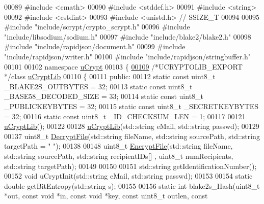 \begin{DoxyCode}
00089 \textcolor{preprocessor}{#include <cmath>}
00090 \textcolor{preprocessor}{#include <stddef.h>}
00091 \textcolor{preprocessor}{#include <string>}
00092 \textcolor{preprocessor}{#include <cstdint>}
00093 \textcolor{preprocessor}{#include <unistd.h>} \textcolor{comment}{// SSIZE\_T}
00094 
00095 \textcolor{preprocessor}{#include "include/scrypt/crypto\_scrypt.h"}
00096 \textcolor{preprocessor}{#include "include/libsodium/sodium.h"}
00097 \textcolor{preprocessor}{#include "include/blake2/blake2.h"}
00098 \textcolor{preprocessor}{#include "include/rapidjson/document.h"}
00099 \textcolor{preprocessor}{#include "include/rapidjson/writer.h"}
00100 \textcolor{preprocessor}{#include "include/rapidjson/stringbuffer.h"}
00101 
00102 \textcolor{keyword}{namespace }\hyperlink{namespaceuCrypt}{uCrypt}
00103 \{
\hypertarget{uCryptLib_8h_source_l00109}{}\hyperlink{classuCrypt_1_1uCryptLib}{00109}   \textcolor{comment}{/*UCRYPTOLIB\_EXPORT */}\textcolor{keyword}{class }\hyperlink{classuCrypt_1_1uCryptLib}{uCryptLib}
00110   \{
00111   \textcolor{keyword}{public}:
00112     \textcolor{keyword}{static} \textcolor{keyword}{const} uint8\_t \_BLAKE2S\_OUTBYTES = 32;
00113     \textcolor{keyword}{static} \textcolor{keyword}{const} uint8\_t \_BASE58\_DECODED\_SIZE = 33;
00114     \textcolor{keyword}{static} \textcolor{keyword}{const} uint8\_t \_PUBLICKEYBYTES = 32;
00115     \textcolor{keyword}{static} \textcolor{keyword}{const} uint8\_t \_SECRETKEYBYTES = 32;
00116     \textcolor{keyword}{static} \textcolor{keyword}{const} uint8\_t \_ID\_CHECKSUM\_LEN = 1;
00117 
00121     \hyperlink{classuCrypt_1_1uCryptLib_aab8ae866a5f5bb7728b76a217f7cabf0}{uCryptLib}();
00122 
00128     \hyperlink{classuCrypt_1_1uCryptLib_aab8ae866a5f5bb7728b76a217f7cabf0}{uCryptLib}(std::string eMail, std::string passwd);
00129 
00137     uint8\_t \hyperlink{classuCrypt_1_1uCryptLib_a868127bd1d2aa4edd62076663d801b66}{DecryptFile}(std::string fileName, std::string sourcePath, std::string targetPath = \textcolor{stringliteral}{"
      "});
00138 
00148     uint8\_t \hyperlink{classuCrypt_1_1uCryptLib_a52da107c55f0d20b709022e1e12ee18e}{EncryptFile}(std::string fileName, std::string sourcePath, std::string recipientIDs[]
      , uint8\_t numRecipients, std::string targetPath);
00149 
00150 
00151     std::string getIdentificationNumber();
00152     \textcolor{keywordtype}{void} uCryptInit(std::string eMail, std::string passwd);
00153 
00154     \textcolor{keyword}{static} \textcolor{keywordtype}{double} getBitEntropy(std::string s);
00155 
00156     \textcolor{keyword}{static} \textcolor{keywordtype}{int}  blake2s\_Hash(uint8\_t *out, \textcolor{keyword}{const} \textcolor{keywordtype}{void} *in, \textcolor{keyword}{const} \textcolor{keywordtype}{void} *key, \textcolor{keyword}{const} uint8\_t outlen, \textcolor{keyword}{const} 

\end{DoxyCode}
